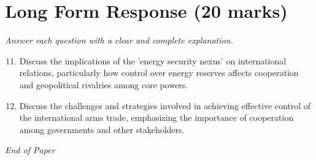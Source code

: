 \documentclass[12pt]{article}
\begin{document}
\section*{Long Form Response (20 marks)}
\textit{Answer each question with a clear and complete explanation.}
\begin{enumerate}[label=\arabic*.]
\setcounter{enumi}{10}
\item Discuss the implications of the 'energy security nexus' on international relations, particularly how control over energy reserves affects cooperation and geopolitical rivalries among core powers.
\item Discuss the challenges and strategies involved in achieving effective control of the international arms trade, emphasizing the importance of cooperation among governments and other stakeholders.
\end{enumerate}

\vfill
\noindent\textit{End of Paper}
\end{document}
